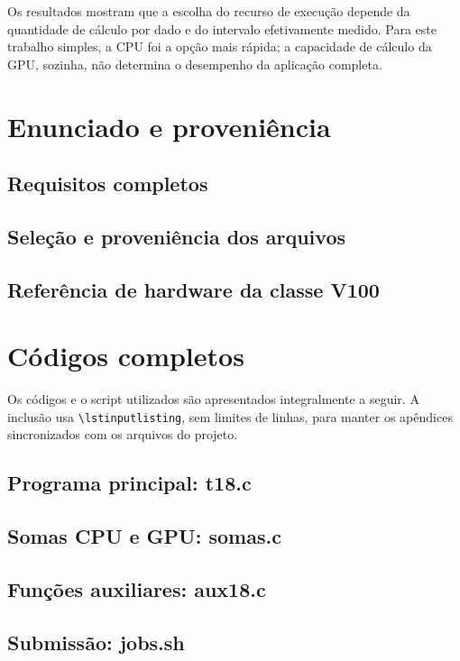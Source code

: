 \documentclass[12pt,a4paper]{article}
\begin{document}
Os resultados mostram que a escolha do recurso de execução depende da quantidade de cálculo por dado e do intervalo efetivamente medido. Para este trabalho simples, a CPU foi a opção mais rápida; a capacidade de cálculo da GPU, sozinha, não determina o desempenho da aplicação completa.

\clearpage\appendix
\section{Enunciado e proveniência}
\subsection{Requisitos completos}

\subsection{Seleção e proveniência dos arquivos}

\subsection{Referência de hardware da classe V100}


\clearpage\section{Códigos completos}
Os códigos e o script utilizados são apresentados integralmente a seguir. A inclusão usa \texttt{\textbackslash lstinputlisting}, sem limites de linhas, para manter os apêndices sincronizados com os arquivos do projeto.
\subsection{Programa principal: t18.c}

\clearpage\subsection{Somas CPU e GPU: somas.c}

\subsection{Funções auxiliares: aux18.c}

\clearpage\subsection{Submissão: jobs.sh}

\end{document}
